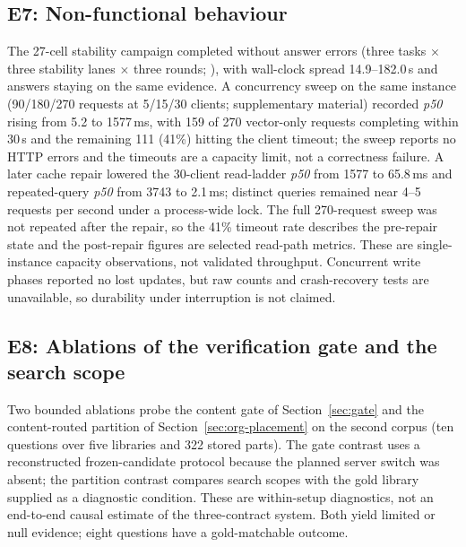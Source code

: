 \subsection{E7: Non-functional behaviour}
\label{sec:e7}
The 27-cell stability campaign completed without answer errors (three tasks
$\times$ three stability lanes $\times$ three rounds;
), with wall-clock spread
14.9--182.0\,s and answers staying on the same evidence. A concurrency
sweep on the same instance (90/180/270 requests at 5/15/30 clients;
supplementary material) recorded \emph{p50} rising from 5.2
to 1577\,ms, with 159 of 270 vector-only requests completing within 30\,s and
the remaining 111 (41\%) hitting the client timeout; the sweep reports no HTTP
errors and the timeouts are a capacity limit, not a correctness failure. A
later cache repair lowered the 30-client read-ladder \emph{p50} from 1577 to
65.8\,ms and repeated-query \emph{p50} from 3743 to 2.1\,ms; distinct
queries remained near 4--5 requests per second under a process-wide lock.
The full 270-request sweep was not repeated after the repair, so the 41\%
timeout rate describes the pre-repair state and the post-repair figures are
selected read-path metrics. These are single-instance capacity observations, not validated throughput.
Concurrent write phases reported no lost updates, but raw counts and
crash-recovery tests are unavailable, so durability under interruption is not
claimed.


\subsection{E8: Ablations of the verification gate and the search scope}
\label{sec:e8}

Two bounded ablations probe the content gate of Section~\ref{sec:gate} and
the content-routed partition of Section~\ref{sec:org-placement} on the second
corpus (ten questions over five libraries and 322 stored parts). The gate
contrast uses a reconstructed frozen-candidate protocol because the planned
server switch was absent; the partition contrast compares search scopes with
the gold library supplied as a diagnostic condition. These are within-setup
diagnostics, not an end-to-end causal estimate of the three-contract system.
Both yield limited or null evidence; eight questions have a gold-matchable
outcome.

